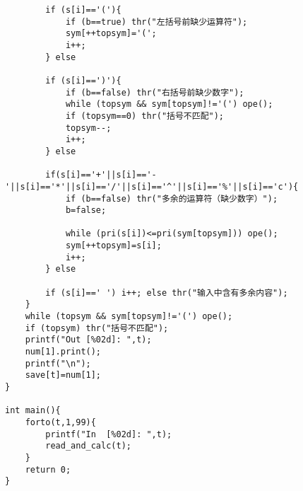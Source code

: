 \documentclass{article}
\begin{document}
\begin{lstlisting}
		if (s[i]=='('){
			if (b==true) thr("左括号前缺少运算符"); 
			sym[++topsym]='(';
			i++;
		} else
		
		if (s[i]==')'){
			if (b==false) thr("右括号前缺少数字"); 
			while (topsym && sym[topsym]!='(') ope();
			if (topsym==0) thr("括号不匹配");
			topsym--;
			i++;
		} else
		
		if(s[i]=='+'||s[i]=='-'||s[i]=='*'||s[i]=='/'||s[i]=='^'||s[i]=='%'||s[i]=='c'){
			if (b==false) thr("多余的运算符（缺少数字）");
			b=false;
			
			while (pri(s[i])<=pri(sym[topsym])) ope();
			sym[++topsym]=s[i];
			i++;
		} else
		
		if (s[i]==' ') i++; else thr("输入中含有多余内容"); 
	}
	while (topsym && sym[topsym]!='(') ope();
	if (topsym) thr("括号不匹配"); 
	printf("Out [%02d]: ",t);
	num[1].print();
	printf("\n");
	save[t]=num[1];
}

int main(){
	forto(t,1,99){
		printf("In  [%02d]: ",t);
		read_and_calc(t);
	}
	return 0;
}
\end{lstlisting}
\end{document}
